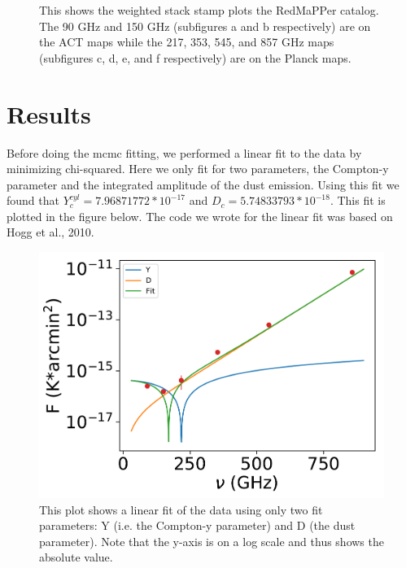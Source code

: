 \documentclass{princeton_astro_thesis}
\begin{document}
\begin{figure}[ht]
\begin{subfigure}[b]{0.1\linewidth}
    \caption{\label{fig:fig3}}
  \end{subfigure}
  \caption{This shows the weighted stack stamp plots the RedMaPPer catalog. The 90 GHz and 150 GHz (subfigures a and b respectively) are on the ACT maps while the 217, 353, 545, and 857 GHz maps (subfigures c, d, e, and f respectively) are on the Planck maps. }
\end{figure}
\chapter{Results}
Before doing the mcmc fitting, we performed a linear fit to the data by minimizing chi-squared. Here we only fit for two parameters, the Compton-y parameter and the integrated amplitude of the dust emission. Using this fit we found that $Y^{cyl}_{c}=7.96871772*10^{-17}$ and $D_c=5.74833793*10^{-18}$. This fit is plotted in the figure below. The code we wrote for the linear fit was based on Hogg et al., 2010.

\begin{figure}[h]
\centering
\includegraphics[width=\textwidth]{../redmapper_apfluxes_fitlog.pdf}
\caption{This plot shows a linear fit of the data using only two fit parameters: Y (i.e. the Compton-y parameter) and D (the dust parameter). Note that the y-axis is on a log scale and thus shows the absolute value.}
\end{figure}
\end{document}
